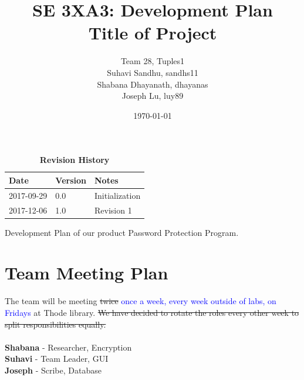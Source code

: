 \documentclass{article}
\title{SE 3XA3: Development Plan\\Title of Project}
\author{Team 28, Tuples1
		\\ Suhavi Sandhu, sandhs11
		\\ Shabana Dhayanath, dhayanas
		\\ Joseph Lu, luy89
}
\date{\today}
\begin{document}
\maketitle

\newpage

\tableofcontents
\listoftables
\listoffigures

\begin{table}[bp]
\caption{\bf Revision History} \label{TblRevisionHistory}
\begin{tabularx}{\textwidth}{p{3cm}p{2cm}X}
\toprule {\bf Date} & {\bf Version} & {\bf Notes}\\
\midrule
2017-09-29 & 0.0 & Initialization\\
2017-12-06 & 1.0 & Revision 1\\
\bottomrule
\end{tabularx}
\end{table}



\newpage


Development Plan of our product Password Protection Program.

\section{Team Meeting Plan}
The team will be meeting \sout{twice} \textcolor{blue}{once a week, every week outside of labs, on Fridays} at Thode library. \sout{We have decided to rotate the roles every other week to split responsibilities equally.}\\\\
\textbf{Shabana} - Researcher, Encryption\\
\textbf{Suhavi} - Team Leader, GUI\\
\textbf{Joseph} - Scribe, Database\\

\end{document}
